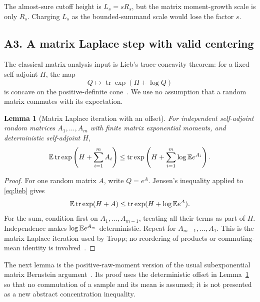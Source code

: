 \documentclass[11pt]{article}
\numberwithin{equation}{section}
\newtheorem{lemma}[theorem]{Lemma}
\theoremstyle{definition}\newtheorem{definition}[theorem]{Definition}
\theoremstyle{remark}\newtheorem{remark}[theorem]{Remark}
\newcommand{\tr}{\operatorname{tr}}\newcommand{\Ent}{\operatorname{Ent}}
\begin{document}
\begin{takeaway}
The almost-sure cutoff height is $L_s=sR_s$, but the matrix moment-growth scale is
only $R_s$. Charging $L_s$ as the bounded-summand scale would lose the factor $s$.
\end{takeaway}

\subsection{A3. A matrix Laplace step with valid centering}\label{sec:A-laplace}
The classical matrix-analysis input is Lieb's trace-concavity theorem: for a fixed
self-adjoint $H$, the map
\begin{equation}\label{eq:lieb}
 Q\longmapsto\tr\exp(H+\log Q)
\end{equation}
is concave on the positive-definite cone~\cite{Lieb,Tropp}.
We use no assumption that a random matrix commutes with its expectation.

\begin{lemma}[Matrix Laplace iteration with an offset]\label{lem:laplace}
For independent self-adjoint random matrices $A_1,\ldots,A_m$ with finite matrix
exponential moments, and deterministic self-adjoint $H$,
\begin{equation}\label{eq:laplace}
 \E\tr\exp\left(H+\sum_{i=1}^mA_i\right)
 \le\tr\exp\left(H+\sum_{i=1}^m\log\E e^{A_i}\right).
\end{equation}
\end{lemma}
\begin{proof}
For one random matrix $A$, write $Q=e^A$. Jensen's inequality applied to
\eqref{eq:lieb} gives
\[
 \E\tr\exp(H+A)\le\tr\exp(H+\log\E e^A).
\]
For the sum, condition first on $A_1,\ldots,A_{m-1}$, treating all their terms as
part of $H$. Independence makes $\log\mathbb E e^{A_m}$ deterministic. Repeat for
$A_{m-1},\ldots,A_1$. This is the matrix Laplace iteration used by Tropp;
no reordering of products or commuting-mean identity is involved~\cite{Tropp}.
\end{proof}

The next lemma is the positive-raw-moment version of the usual subexponential
matrix Bernstein argument~\cite[Theorem~6.2 and Lemma~6.8]{Tropp}.
Its proof uses the deterministic offset in Lemma~\ref{lem:laplace} so that no
commutation of a sample and its mean is assumed; it is not presented as a new
abstract concentration inequality.
\end{document}
